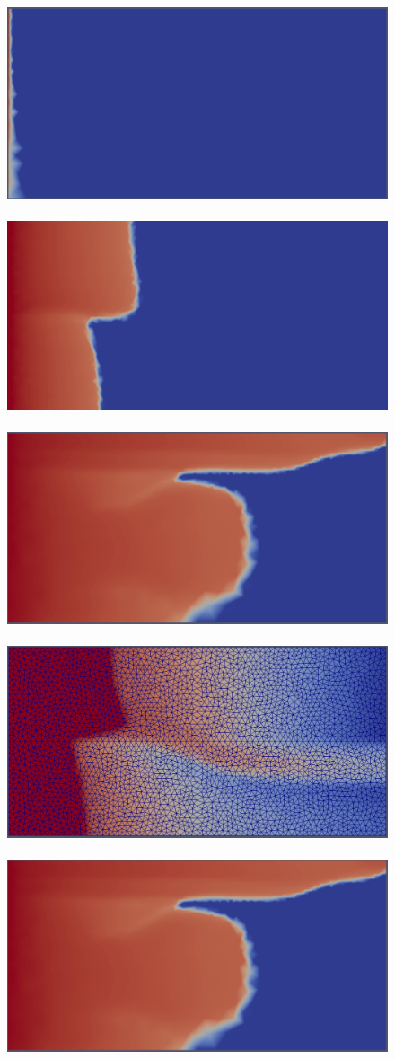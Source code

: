 \begin{landscape}
  \begin{figure}[ht]
    \vbox{ 
      \hbox{\includegraphics[width=.55\textwidth]{./Pics1/mr1_fixed/mr1_fixed_100_2.pdf}
            \includegraphics[width=.55\textwidth]{./Pics1/2b2_wi_fine/2b2_whole_in_fine_250_2.pdf}
            \includegraphics[width=.55\textwidth]{./Pics1/mr1_fixed/mr1_fixed_middle_1.pdf} }
      \vspace{0.cm}
      \hbox{\includegraphics[width=.55\textwidth]{./Pics1/2b2_wi_fine/2b2_whole_in_fine_3000_1.pdf}
            \includegraphics[width=.55\textwidth]{./Pics1/mr1_fixed/mr1_fixed_middle_1.pdf}}}
\caption{}
\label{fem_cv_represent_abc}
\end{figure}
\end{landscape}
\clearpage



